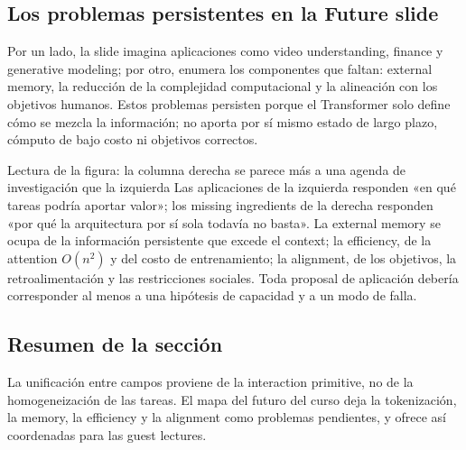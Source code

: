 \subsection{Los problemas persistentes en la Future slide}

Por un lado, la slide imagina aplicaciones como video understanding, finance y generative modeling; por otro, enumera los componentes que faltan: external memory, la reducción de la complejidad computacional y la alineación con los objetivos humanos. Estos problemas persisten porque el Transformer solo define cómo se mezcla la información; no aporta por sí mismo estado de largo plazo, cómputo de bajo costo ni objetivos correctos.


\begin{knowledgebox}{Lectura de la figura: la columna derecha se parece más a una agenda de investigación que la izquierda}
Las aplicaciones de la izquierda responden «en qué tareas podría aportar valor»; los missing ingredients de la derecha responden «por qué la arquitectura por sí sola todavía no basta». La external memory se ocupa de la información persistente que excede el context; la efficiency, de la attention $O(n^2)$ y del costo de entrenamiento; la alignment, de los objetivos, la retroalimentación y las restricciones sociales. Toda proposal de aplicación debería corresponder al menos a una hipótesis de capacidad y a un modo de falla.
\end{knowledgebox}


\subsection{Resumen de la sección}

La unificación entre campos proviene de la interaction primitive, no de la homogeneización de las tareas. El mapa del futuro del curso deja la tokenización, la memory, la efficiency y la alignment como problemas pendientes, y ofrece así coordenadas para las guest lectures.

